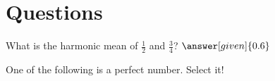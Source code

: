 \documentclass{ximera}
\begin{document}
\section{Questions}

\begin{question}
What is the harmonic mean of $\frac12$ and $\frac34$? $\answer[given]{0.6}$
\end{question}

\begin{question}
One of the following is a perfect number. Select it!
\begin{multipleChoice}
\end{multipleChoice}
\end{question}


\end{document}
